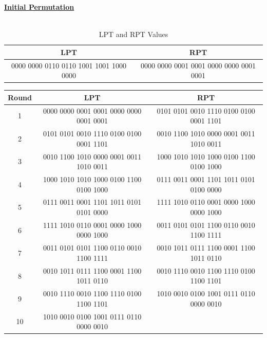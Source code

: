 \documentclass[12pt, letterpaper]{article}
\begin{document}
\underline{\textbf{Initial Permutation}} \\
\\
\begin{table}[h]
    \centering
    \begin{tabular}{|c|c|}
        \hline
        LPT & RPT \\
        \hline
        0000 0000 0110 0110 1001 1001 1000 0000 & 0000 0000 0001 0001 0000 0000 0001 0001  \\
        \hline
    \end{tabular}
    \caption{LPT and RPT Values}
    \label{tab:lpt-rpt}
\end{table}


\begin{table}[ht]
  \centering
  \label{tab:sample-table}
  \begin{tabular}{|c|c|c|}
    \hline
    Round & LPT & RPT  \\
    \hline
    1 & 0000 0000 0001 0001 0000 0000 0001 0001  & 0101 0101 0010 1110 0100 0100 0001 1101  \\
        \hline
    2 & 0101 0101 0010 1110 0100 0100 0001 1101

 & 0010 1100 1010 0000 0001 0011 1010 0011

  \\
         \hline
    3 & 0010 1100 1010 0000 0001 0011 1010 0011 & 1000 1010 1010 1000 0100 1100 0100 1000  \\
         \hline
    4 & 1000 1010 1010 1000 0100 1100 0100 1000 & 0111 0011 0001 1101 1011 0101 0100 0000  \\
         \hline
    5 & 0111 0011 0001 1101 1011 0101 0101 0000 & 1111 1010 0110 0001 0000 1000 0000 1000  \\
        \hline
    6 & 1111 1010 0110 0001 0000 1000 0000 1000 & 0011 0101 0101 1100 0110 0010 1100 1111  \\
         \hline
    7 & 0011 0101 0101 1100 0110 0010 1100 1111 & 0010 1011 0111 1100 0001 1100 1011 0110

  \\
         \hline
    8 & 0010 1011 0111 1100 0001 1100 1011 0110

 & 0010 1110 0010 1100 1110 0100 1100 1101

  \\
         \hline
    9 & 0010 1110 0010 1100 1110 0100 1100 1101

 & 1010 0010 0100 1001 0111 0110 0000 0010

  \\
         \hline
    10 & 1010 0010 0100 1001 0111 0110 0000 0010


\end{tabular}
\end{table}
\end{document}
